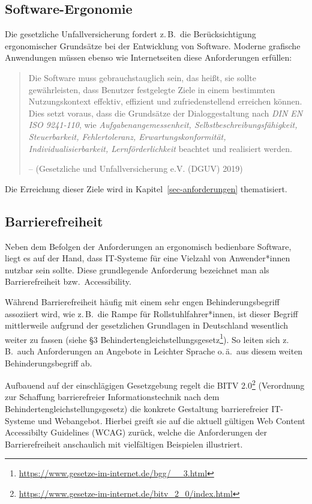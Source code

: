 \documentclass[
  11pt,
  letterpaper,
  DIV=11,
  twoside]{scrreprt}
\DeclareRobustCommand{\href}[2]{#2\footnote{\url{#1}}}
\begin{document}
\subsection{Software-Ergonomie}\label{software-ergonomie}

Die gesetzliche Unfallversicherung fordert z.\,B.~die Berücksichtigung
ergonomischer Grundsätze bei der Entwicklung von Software. Moderne
grafische Anwendungen müssen ebenso wie Internetseiten diese
Anforderungen erfüllen:

\begin{quote}
Die Software muss gebrauchstauglich sein, das heißt, sie sollte
gewährleisten, dass Benutzer festgelegte Ziele in einem bestimmten
Nutzungskontext effektiv, effizient und zufriedenstellend erreichen
können. Dies setzt voraus, dass die Grundsätze der Dialoggestaltung nach
\emph{DIN EN ISO 9241-110}, wie \emph{Aufgabenangemessenheit,
Selbstbeschreibungsfähigkeit, Steuerbarkeit, Fehlertoleranz,
Erwartungskonformität, Individualisierbarkeit, Lernförderlichkeit}
beachtet und realisiert werden.

-- (Gesetzliche und Unfallversicherung e.V. (DGUV) 2019)
\end{quote}

Die Erreichung dieser Ziele wird in Kapitel~\ref{sec-anforderungen}
thematisiert.

\subsection{Barrierefreiheit}\label{accessibility}

Neben dem Befolgen der Anforderungen an ergonomisch bedienbare Software,
liegt es auf der Hand, dass IT-Systeme für eine Vielzahl von
Anwender*innen nutzbar sein sollte. Diese grundlegende Anforderung
bezeichnet man als Barrierefreiheit bzw.~Accessibility.

Während Barrierefreiheit häufig mit einem sehr engen Behinderungsbegriff
assoziiert wird, wie z.\,B.~die Rampe für Rollstuhlfahrer*innen, ist
dieser Begriff mittlerweile aufgrund der gesetzlichen Grundlagen in
Deutschland wesentlich weiter zu fassen (siehe
\href{https://www.gesetze-im-internet.de/bgg/__3.html}{§3
Behindertengleichstellungsgesetz}). So leiten sich z.\,B.~auch
Anforderungen an Angebote in Leichter Sprache o.\,ä.~aus diesem weiten
Behinderungsbegriff ab.

Aufbauend auf der einschlägigen Gesetzgebung regelt die
\href{https://www.gesetze-im-internet.de/bitv_2_0/index.html}{BITV 2.0}
(Verordnung zur Schaffung barrierefreier Informationstechnik nach dem
Behindertengleichstellungsgesetz) die konkrete Gestaltung barrierefreier
IT-Systeme und Webangebot. Hierbei greift sie auf die aktuell gültigen
Web Content Accessibilty Guidelines ({WCAG}) zurück, welche die
Anforderungen der Barrierefreiheit anschaulich mit vielfältigen
Beispielen illustriert.
\end{document}
